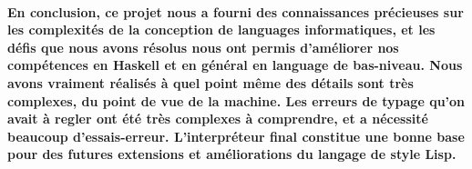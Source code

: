 \documentclass{article}
\begin{document}
\paragraph{En conclusion, ce projet nous a fourni des connaissances précieuses sur les complexités de la conception de languages informatiques, et les défis que nous avons résolus nous ont permis d'améliorer nos compétences en Haskell et en général en language de bas-niveau. Nous avons vraiment réalisés à quel point même des détails sont très complexes, du point de vue de la machine. Les erreurs de typage qu'on avait à regler ont été très complexes à comprendre, et a nécessité beaucoup d'essais-erreur. L'interpréteur final constitue une bonne base pour des futures extensions et améliorations du langage de style Lisp. }
\end{document}
